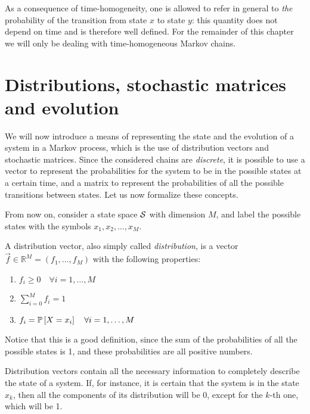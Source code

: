 As a consequence of time-homogeneity, one is allowed to refer in general to \emph{the} probability of the transition from state $x$ to state $y$: this quantity does not depend on time and is therefore well defined. For the remainder of this chapter we will only be dealing with time-homogeneous Markov chains.

\section{Distributions, stochastic matrices and evolution}
We will now introduce a means of representing the state and the evolution of a system in a Markov process, which is the use of distribution vectors and stochastic matrices. Since the considered chains are \emph{discrete}, it is possible to use a vector to represent the probabilities for the system to be in the possible states at a certain time, and a matrix to represent the probabilities of all the possible transitions between states. Let us now formalize these concepts.

\smallskip
From now on, consider a state space $\mathcal{S}$ with dimension $M$, and label the possible states with the symbols $x_1, x_2, \dots, x_M$.

\begin{ndef} \label{def:distribution}
    A distribution vector, also simply called \emph{distribution}, is a vector $\vec{f} \in \mathbb{R}^M = (f_1, \dots, f_M)$ with the following properties:
    \begin{center}
        \begin{enumerate}
            \item $ f_i \geq 0 \quad \forall i = 1,\dots, M $
            \item $\sum_{i=0}^M f_i = 1$
            \item $f_i = \mathbb{P}\left[X = x_i\right] \quad \forall i = 1,\dots, M$
        \end{enumerate}
    \end{center}
    Notice that this is a good definition, since the sum of the probabilities of all the possible states is 1, and these probabilities are all positive numbers.
\end{ndef}

Distribution vectors contain all the necessary information to completely describe the state of a system. If, for instance, it is certain that the system is in the state $x_k$, then all the components of its distribution will be 0, except for the $k$-th one, which will be 1.


